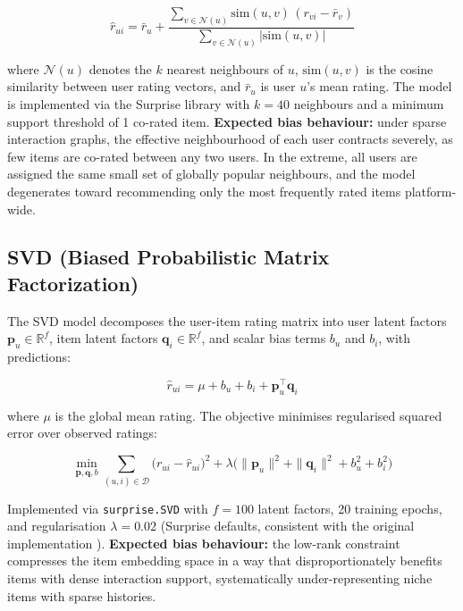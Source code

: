 \documentclass[11pt,a4paper]{report}
\begin{document}
\begin{equation}
\hat{r}_{ui} = \bar{r}_u + \frac{\sum_{v \in \mathcal{N}(u)} \text{sim}(u,v)\,(r_{vi} - \bar{r}_v)}{\sum_{v \in \mathcal{N}(u)} |\text{sim}(u,v)|}
\end{equation}

where $\mathcal{N}(u)$ denotes the $k$ nearest neighbours of $u$, $\text{sim}(u,v)$ is the cosine similarity between user rating vectors, and $\bar{r}_u$ is user $u$'s mean rating. The model is implemented via the Surprise library \citep{hug2020surprise} with $k = 40$ neighbours and a minimum support threshold of 1 co-rated item. \textbf{Expected bias behaviour:} under sparse interaction graphs, the effective neighbourhood of each user contracts severely, as few items are co-rated between any two users. In the extreme, all users are assigned the same small set of globally popular neighbours, and the model degenerates toward recommending only the most frequently rated items platform-wide.

\subsection*{SVD (Biased Probabilistic Matrix Factorization)}

The SVD model decomposes the user-item rating matrix into user latent factors $\mathbf{p}_u \in \mathbb{R}^f$, item latent factors $\mathbf{q}_i \in \mathbb{R}^f$, and scalar bias terms $b_u$ and $b_i$, with predictions:

\begin{equation}
\hat{r}_{ui} = \mu + b_u + b_i + \mathbf{p}_u^\top \mathbf{q}_i
\end{equation}

where $\mu$ is the global mean rating. The objective minimises regularised squared error over observed ratings:

\begin{equation}
\min_{\mathbf{p},\mathbf{q},b} \sum_{(u,i) \in \mathcal{D}} \bigl(r_{ui} - \hat{r}_{ui}\bigr)^2 + \lambda\bigl(\|\mathbf{p}_u\|^2 + \|\mathbf{q}_i\|^2 + b_u^2 + b_i^2\bigr)
\end{equation}

Implemented via \texttt{surprise.SVD} with $f = 100$ latent factors, 20 training epochs, and regularisation $\lambda = 0.02$ (Surprise defaults, consistent with the original implementation \citep{koren2009matrix}). \textbf{Expected bias behaviour:} the low-rank constraint compresses the item embedding space in a way that disproportionately benefits items with dense interaction support, systematically under-representing niche items with sparse histories.
\end{document}

